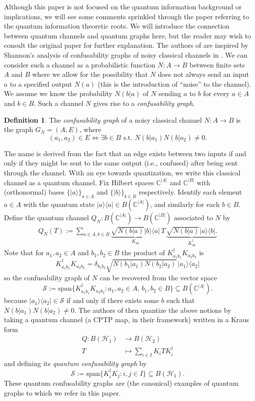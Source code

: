 \documentclass[12pt]{article}
\theoremstyle{definition}
\newtheorem{definition}[theorem]{Definition}
\newcommand{\C}{\mathbb C}
\newcommand{\Span}{\text{span}}
\newcommand{\mc}[1]{\mathcal{#1}}
\newcommand{\<}{\langle}
\renewcommand{\>}{\rangle}
\renewcommand{\subset}{\subseteq}
\begin{document}
Although this paper is not focused on the quantum information background or implications, we will see some comments sprinkled through the paper referring to the quantum information theoretic roots. We will introduce the connection between quantum channels and quantum graphs here, but the reader may wish to consult the original paper \cite{dsw} for further explanation. The authors of \cite{dsw} are inspired by Shannon's analysis of confusability graphs of noisy classical channels in \cite{shannon}. We can consider such a channel as a probabilistic function $N: A \to B$ between finite sets $A$ and $B$ where we allow for the possibility that $N$ does not always send an input $a$ to a specified output $N(a)$ (this is the introduction of ``noise'' to the channel). We assume we know the probability $N(b|a)$ of $N$ sending $a$ to $b$ for every $a \in A$ and $b \in B$. Such a channel $N$ gives rise to a \textit{confusability graph}.

\begin{definition}
    The \textit{confusability graph} of a noisy classical channel $N: A \to B$ is the graph $G_N = (A, E)$, where
    \[
    (a_1, a_2) \in E \iff \exists b \in B \text{ s.t. } N(b|a_1 )N(b|a_2) \neq 0.
    \]
\end{definition}

The name is derived from the fact that an edge exists between two inputs if and only if they might be sent to the same output (i.e., confused) after being sent through the channel. With an eye towards quantization, we write this classical channel as a quantum channel. Fix Hilbert spaces $\C^{|A|}$ and $\C^{|B|}$ with (orthonormal) bases $\{|a\>\}_{a \in A}$ and $\{|b\>\}_{b \in B}$ respectively. Identify each element $a \in A$ with the quantum state $|a\>\<a| \in B(\C^{|A|})$, and similarly for each $b \in B$. Define the quantum channel $Q_N : B(\C^{|A|}) \to B(\C^{|B|})$ associated to $N$ by
\begin{align*}
    Q_N (T) := \sum_{a \in A, b \in B}\underbrace{\sqrt{N(b|a)} |b\>\<a|}_{K_{ab}} \, T \,  \underbrace{\sqrt{N(b|a)} |a\>\<b|.}_{K_{ab}^\dagger}
\end{align*}
Note that for $a_1, a_2 \in A$ and $b_1,b_2 \in B$ the product of $K_{a_1b_1}^\dagger K_{a_2b_2}$ is
\[
K_{a_1b_1}^\dagger K_{a_2b_2} = \delta_{b_1b_2} \sqrt{N(b_1|a_1) N(b_2|a_2)} \, |a_1\>\<a_2|
\]
so the confusability graph of $N$ can be recovered from the vector space 
\[
\mc S := \Span\{ K_{a_1b_1}^\dagger K_{a_2b_2} : a_1,a_2 \in A, \, b_1, b_2 \in B\} \subset B(\C^{|A|}).
\]
because $|a_1\>\< a_2| \in \mc S$ if and only if there exists some $b$ such that $N(b|a_1)N(b|a_2) \neq 0$. The authors of \cite{dsw} then quantize the above notions by taking a quantum channel (a CPTP map, in their framework) written in a Kraus form
\begin{align*}
    Q : B(\mc H_1) &\to B(\mc H_2) \\
    T &\mapsto \sum_{i \in I} K_i T K_i^\dagger
\end{align*}
and defining its \textit{quantum confusability graph} \cite[Equation (2)]{dsw} by
\[
\mc S := \Span \{K_i^\dagger K_j : i,j \in I\} \subset B(\mc H_1).
\]
These quantum confusability graphs are (the canonical) examples of quantum graphs to which we refer in this paper.
\end{document}
